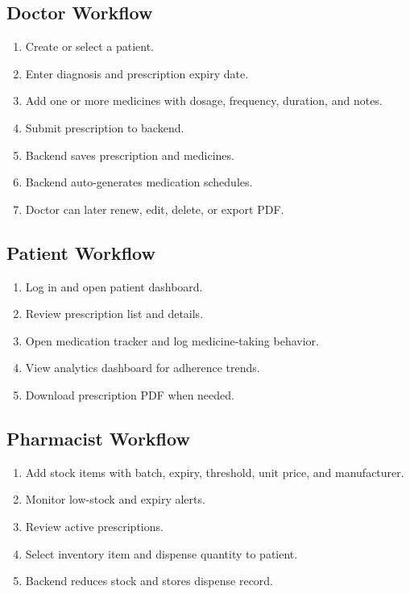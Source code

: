 \documentclass[12pt,a4paper]{article}
\begin{document}
\subsection{Doctor Workflow}
\begin{enumerate}[leftmargin=*]
  \item Create or select a patient.
  \item Enter diagnosis and prescription expiry date.
  \item Add one or more medicines with dosage, frequency, duration, and notes.
  \item Submit prescription to backend.
  \item Backend saves prescription and medicines.
  \item Backend auto-generates medication schedules.
  \item Doctor can later renew, edit, delete, or export PDF.
\end{enumerate}

\subsection{Patient Workflow}
\begin{enumerate}[leftmargin=*]
  \item Log in and open patient dashboard.
  \item Review prescription list and details.
  \item Open medication tracker and log medicine-taking behavior.
  \item View analytics dashboard for adherence trends.
  \item Download prescription PDF when needed.
\end{enumerate}

\subsection{Pharmacist Workflow}
\begin{enumerate}[leftmargin=*]
  \item Add stock items with batch, expiry, threshold, unit price, and manufacturer.
  \item Monitor low-stock and expiry alerts.
  \item Review active prescriptions.
  \item Select inventory item and dispense quantity to patient.
  \item Backend reduces stock and stores dispense record.
\end{enumerate}
\end{document}

